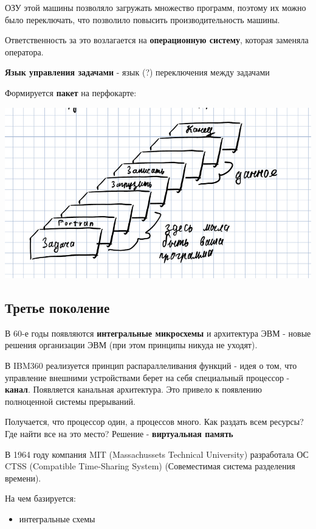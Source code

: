 \documentclass[14pt, a4paper]{article}
\begin{document}
{	ОЗУ этой машины позволяло загружать множество программ,
	поэтому их можно было переключать, что позволило повысить производительность машины.
	
	Ответственность за это возлагается на {\bf операционную систему}, которая заменяла оператора.
	
	{\bf Язык управления задачами} - язык (?) переключения между задачами
	
	Формируется {\bf пакет} на перфокарте:
	
	\includegraphics[width=\linewidth]{package}
	
	\subsection*{Третье поколение}
	
	В 60-е годы появляются {\bf интегральные микросхемы} и архитектура ЭВМ - новые решения организации ЭВМ (при этом принципы никуда не уходят).
	
	В IBM360 реализуется принцип распараллеливания функций - идея о том, что управление внешними устройствами
	берет на себя специальный процессор - {\bf канал}. Появляется канальная архитектура. Это привело к появлению полноценной
	системы прерываний.
	
	Получается, что процессор один, а процессов много. Как раздать всем ресурсы? Где найти все на это место? Решение - {\bf виртуальная память}
	
	В 1964 году компания MIT (Massachussets Technical University) разработала ОС CTSS (Compatible Time-Sharing System) (Совеместимая система разделения времени).
	
	На чем базируется:
	
	\begin{itemize}
		\item интегральные схемы
		

\end{itemize}}
\end{document}
